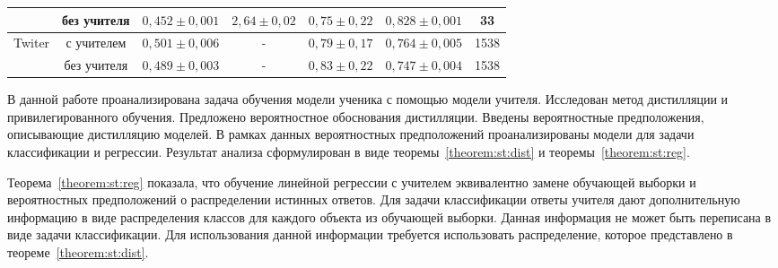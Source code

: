 \documentclass[12pt]{a&t}
\begin{document}
\begin{table}[]
\begin{center}
{\begin{tabular}{|l|c|c|c|c|c|c|}
                              & без учителя & $0{,}452\pm0{,}001$                                                & $2{,}64\pm0{,}02$                                                                             & $0{,}75\pm0{,}22$                                               & $0{,}828\pm0{,}001$ & 33                                                         \\ \hline
\multirow{2}{*}{Twiter}       & с учителем  & $0{,}501\pm0{,}006$                                                & -                                                                                             & $0{,}79\pm0{,}17$                                               & $0{,}764\pm0{,}005$ & 1538                                                       \\ \cline{2-7} 
                              & без учителя & $0{,}489\pm0{,}003$                                                & -                                                                                             & $0{,}83\pm0{,}22$                                               & $0{,}747\pm0{,}004$ & 1538                                                       \\ \hline
\end{tabular}
}
\end{center}
\end{table}



В данной работе проанализирована задача обучения модели ученика с помощью модели учителя.
Исследован метод дистилляции и привилегированного обучения.
Предложено вероятностное обоснования дистилляции.
Введены вероятностные предположения, описывающие дистилляцию моделей.
В рамках данных вероятностных предположений проанализированы модели для задачи классификации и регрессии. Результат анализа сформулирован в виде теоремы~\ref{theorem:st:dist} и теоремы~\ref{theorem:st:reg}.

Теорема~\ref{theorem:st:reg} показала, что обучение линейной регрессии с учителем эквивалентно замене обучающей выборки и вероятностных предположений о распределении истинных ответов. Для задачи классификации ответы учителя дают дополнительную информацию в виде распределения классов для каждого объекта из обучающей выборки. Данная информация не может быть переписана в виде задачи классификации. Для использования данной информации требуется использовать распределение, которое представлено в теореме~\ref{theorem:st:dist}.
\end{document}
